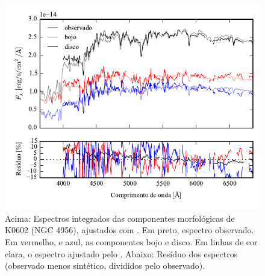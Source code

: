 \begin{figure}
	\includegraphics[page=7]{figuras/sample006a_synthesis}
	\caption[Espectros ajustados com \starlight das componentes morfológicas de
	K0602 (NGC 4956)]
	{Acima: Espectros integrados das componentes morfológicas de
	K0602 (NGC 4956), ajustados com \starlight. Em preto, espectro observado. Em
	vermelho, e azul, as componentes bojo e disco. Em linhas de cor clara, o
	espectro ajustado pelo \starlight. Abaixo: Resíduo dos espectros (observado
	menos sintético, divididos pelo observado).}
	\label{fig:decompSintese:K0602}
\end{figure}

